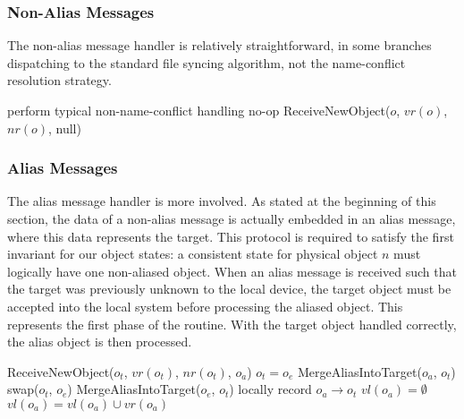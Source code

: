 \subsubsection*{Non-Alias Messages}

The non-alias message handler is relatively straightforward, in some branches
dispatching to the standard file syncing algorithm, not the name-conflict
resolution strategy.
\begin{algorithmic}
    \State perform typical non-name-conflict handling
    \State no-op
\Else
    \State ReceiveNewObject($o$, $vr(o)$, $nr(o)$, null)
\EndIf
\EndFunction
\end{algorithmic}

\subsubsection*{Alias Messages}

The alias message handler is more involved. As stated at the beginning of this
section, the data of a non-alias message is actually embedded in an alias
message, where this data represents the target. This protocol is required to
satisfy the first invariant for our object states: a consistent state for
physical object $n$ must logically have one non-aliased object. When an alias
message is received such that the target was previously unknown to the local
device, the target object must be accepted into the local system before
processing the aliased object. This represents the first phase of the routine.
With the target object handled correctly, the alias object is then processed.

\begin{algorithmic}
    \State ReceiveNewObject($o_t$, $vr(o_t)$, $nr(o_t)$, $o_a$)
\EndIf
{}
    \State $o_t = o_e$
\EndIf
    \State MergeAliasIntoTarget($o_a$, $o_t$)
            \State swap($o_t$, $o_e$)
        \EndIf
        \State MergeAliasIntoTarget($o_e$, $o_t$)
    \EndIf
\Else
    \State locally record $o_a\rightarrow o_t$
    \State $vl(o_a) = \emptyset$
\EndIf
\State $vl(o_a) = vl(o_a) \cup vr(o_a)$
\EndFunction
\end{algorithmic}

